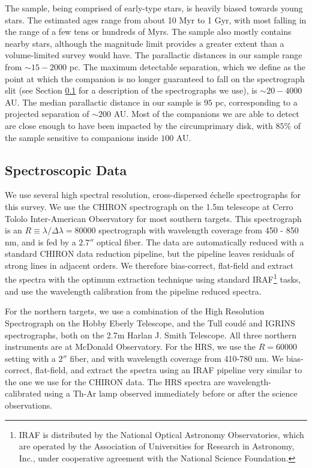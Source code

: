 \documentclass{emulateapj}
\begin{document}
The sample, being comprised of early-type stars, is heavily biased towards young stars. The estimated ages range from about 10 Myr to 1 Gyr, with most falling in the range of a few tens or hundreds of Myrs. The sample also mostly contains nearby stars, although the magnitude limit provides a greater extent than a volume-limited survey would have. The parallactic distances in our sample range from $\sim 15 - 2000$ pc. The maximum detectable separation, which we define as the point at which the companion is no longer guaranteed to fall on the spectrograph slit (see Section \ref{subsec:specdata} for a description of the spectrographs we use), is $\sim 20 - 4000$ AU. The median parallactic distance in our sample is $95$ pc, corresponding to a projected separation of $\sim 200$ AU. Most of the companions we are able to detect are close enough to have been impacted by the circumprimary disk, with $85\%$ of the sample sensitive to companions inside $100$ AU. 


\subsection{Spectroscopic Data}
\label{subsec:specdata}
We use several high spectral resolution, cross-dispersed \'echelle spectrographs for this survey. We use the CHIRON spectrograph \citep{CHIRON} on the 1.5m telescope at Cerro Tololo Inter-American Observatory for most southern targets. This spectrograph is an $R\equiv \lambda / \Delta \lambda = 80000$ spectrograph with wavelength coverage from 450 - 850 nm, and is fed by a $2.7''$ optical fiber. The data are automatically reduced with a standard CHIRON data reduction pipeline, but the pipeline leaves residuals of strong lines in adjacent orders. We therefore bias-correct, flat-field and extract the spectra with the optimum extraction technique \citep{Horne1986} using standard IRAF\footnote{IRAF is distributed by the National Optical Astronomy Observatories, which are operated by the Association of Universities for Research in Astronomy, Inc., under cooperative agreement with the National Science Foundation.} tasks, and use the wavelength calibration from the pipeline reduced spectra.

For the northern targets, we use a combination of the High Resolution Spectrograph \citep[HRS,][]{HRS} on the Hobby Eberly Telescope, and the Tull coud\'e \citep[TS23,][]{TS23} and IGRINS \citep{IGRINS} spectrographs, both on the 2.7m Harlan J. Smith Telescope. All three northern instruments are at McDonald Observatory. For the HRS, we use the $R = 60000$ setting with a $2''$ fiber, and with wavelength coverage from 410-780 nm. We bias-correct, flat-field, and extract the spectra using an IRAF pipeline very similar to the one we use for the CHIRON data. The HRS spectra are wavelength-calibrated using a Th-Ar lamp observed immediately before or after the science observations.
\end{document}

